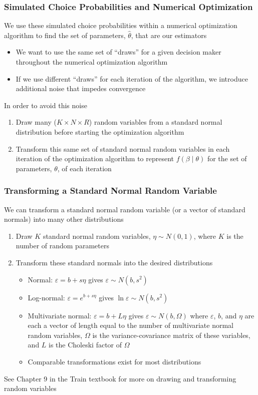 \documentclass{beamer}
\begin{document}
\begin{frame}\frametitle{Simulated Choice Probabilities and Numerical Optimization}
    We use these simulated choice probabilities within a numerical optimization algorithm to find the set of parameters, $\hat{\theta}$, that are our estimators
    \begin{itemize}
        \item We want to use the same set of ``draws'' for a given decision maker throughout the numerical optimization algorithm
        \item If we use different ``draws'' for each iteration of the algorithm, we introduce additional noise that impedes convergence
    \end{itemize}
    \vspace{3ex}
     In order to avoid this noise
    \begin{enumerate}
        \item Draw many ($K \times N \times R$) random variables from a standard normal distribution before starting the optimization algorithm
        \item Transform this same set of standard normal random variables in each iteration of the optimization algorithm to represent $f(\beta \mid \theta)$ for the set of parameters, $\theta$, of each iteration
    \end{enumerate}
\end{frame}

\begin{frame}\frametitle{Transforming a Standard Normal Random Variable}
    We can transform a standard normal random variable (or a vector of standard normals) into many other distributions
    \begin{enumerate}
        \item Draw $K$ standard normal random variables, $\eta \sim N(0, 1)$, where $K$ is the number of random parameters
        \item Transform these standard normals into the desired distributions
        \begin{itemize}
            \item Normal: $\varepsilon = b + s \eta$ gives $\varepsilon \sim N(b, s^2)$
            \item Log-normal: $\varepsilon = e^{b + s \eta}$ gives $\ln \varepsilon \sim N(b, s^2)$
            \item Multivariate normal: $\varepsilon = b + L \eta$ gives $\varepsilon \sim N(b, \Omega)$ where $\varepsilon$, $b$, and $\eta$ are each a vector of length equal to the number of multivariate normal random variables, $\Omega$ is the variance-covariance matrix of these variables, and $L$ is the Choleski factor of $\Omega$
            \item Comparable transformations exist for most distributions
        \end{itemize}
    \end{enumerate}
    \vspace{2ex}
    See Chapter 9 in the Train textbook for more on drawing and transforming random variables
\end{frame}
\end{document}
